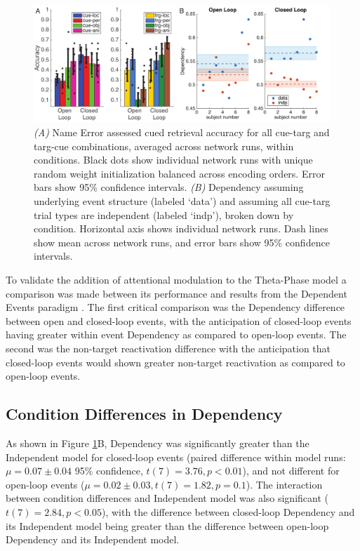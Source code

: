 \documentclass[11pt, titlepage, twoside]{article}
\begin{document}
\begin{figure}
    \begin{center}
	\includegraphics[width=\textwidth]{figs/netDep.pdf}
    \end{center}
      \caption[Open vs. Close Loop Performance]{
       \emph{(A)} Name Error assessed cued retrieval accuracy for all cue-targ and targ-cue combinations, averaged across network runs, within conditions. Black dots show individual network runs with unique random weight initialization balanced across encoding orders.  Error bars show 95\% confidence intervals.  \emph{(B)} Dependency assuming underlying event structure (labeled `data') and assuming all cue-targ trial types are independent (labeled `indp'), broken down by condition.  Horizontal axis shows individual network runs.  Dash lines show mean across network runs, and error bars show 95\% confidence intervals.
	}
     \label{fig:netDep}
\end{figure}

To validate the addition of attentional modulation to the Theta-Phase model a comparison was made between its performance and results from the Dependent Events paradigm%
.  The first critical comparison was the Dependency difference between open and closed-loop events, with the anticipation of closed-loop events having greater within event Dependency as compared to open-loop events.  The second was the non-target reactivation difference with the anticipation that closed-loop events would shown greater non-target reactivation as compared to open-loop events.

\subsection{Condition Differences in Dependency}
As shown in Figure \ref{fig:netDep}B, Dependency was significantly greater than the Independent model for closed-loop events (paired difference within model runs: $\mu=0.07\pm0.04$ 95\% confidence, $t(7)=3.76,p<0.01$), and not different for open-loop events ($\mu=0.02\pm0.03, t(7)=1.82,p=0.1$).  The interaction between condition differences and Independent model was also significant ($t(7)=2.84,p<0.05$), with the difference between closed-loop Dependency and its Independent model being greater than the difference between open-loop Dependency and its Independent model.
\end{document}
